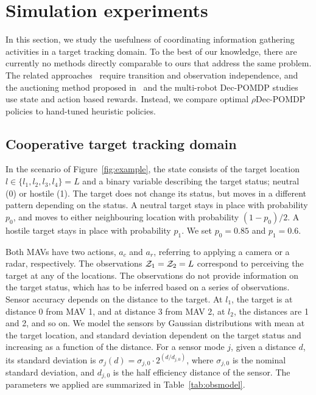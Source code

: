 \section{Simulation experiments}
\label{sec:simulation}
In this section, we study the usefulness of coordinating information gathering activities in a target tracking domain.
To the best of our knowledge, there are currently no methods directly comparable to ours that address the same problem.
The related approaches~\cite{Nair2005,Renoux2015} require transition and observation independence, and the auctioning method proposed in~\cite{Capitan2013} and the multi-robot Dec-POMDP studies~\cite{Omidshafiei2015,Omidshafiei2016} use state and action based rewards.
Instead, we compare optimal $\rho$Dec-POMDP policies to hand-tuned heuristic policies.

\subsection{Cooperative target tracking domain} 
In the scenario of Figure~\ref{fig:example}, the state consists of the target location $l \in \{l_1, l_2, l_3, l_4\} = L$ and a binary variable describing the target status; neutral (0) or hostile (1).
The target does not change its status, but moves in a different pattern depending on the status.
A neutral target stays in place with probability $p_0$, and moves to either neighbouring location with probability $(1-p_0)/2$.
A hostile target stays in place with probability $p_1$.
We set $p_0 = 0.85$ and $p_1 = 0.6$.

Both MAVs have two actions, $a_c$ and $a_r$, referring to applying a camera or a radar, respectively.
The observations $\mathcal{Z}_1=\mathcal{Z}_2=L$ correspond to perceiving the target at any of the locations.
The observations do not provide information on the target status, which has to be inferred based on a series of observations.
Sensor accuracy depends on the distance to the target.
At $l_1$, the target is at distance 0 from MAV 1, and at distance 3 from MAV 2, at $l_2$, the distances are 1 and 2, and so on.
We model the sensors by Gaussian distributions with mean at the target location, and standard deviation dependent on the target status and increasing as a function of the distance.
For a sensor mode $j$, given a distance $d$, its standard deviation is $\sigma_j(d) = \sigma_{j,0} \cdot 2^{(d/d_{j,0})}$, where $\sigma_{j,0}$ is the nominal standard deviation, and $d_{j,0}$ is the half efficiency distance of the sensor.
The parameters we applied are summarized in Table~\ref{tab:obsmodel}.

